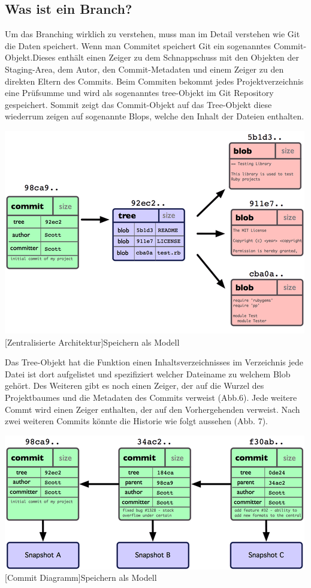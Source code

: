\documentclass[12pt,a4paper,bibliography=totocnumbered,listof=totocnumbered]{scrartcl}
\begin{document}
\subsection{Was ist ein Branch?}
Um das Branching wirklich zu verstehen, muss man im Detail verstehen wie Git die Daten speichert.	Wenn man Commitet speichert Git	ein sogenanntes Commit-Objekt.Dieses enthält einen Zeiger zu dem Schnappschuss mit den Objekten der Staging-Area, dem Autor, den Commit-Metadaten und einem Zeiger zu den direkten Eltern des Commits. Beim Commiten bekommt jedes Projektverzeichnis eine Prüfsumme und wird  als sogenanntes tree-Objekt im Git Repository gespeichert. Sommit zeigt das Commit-Objekt auf das Tree-Objekt	diese wiederrum zeigen auf sogenannte Blops, welche den Inhalt der Dateien enthalten.	
\vspace{1em}
\begin{minipage}{\linewidth}
	\centering
	\includegraphics[width=0.6\linewidth]{Bilder/speichern.png}
	[Zentralisierte Architektur]{Speichern als Modell\footnotemark }
	\label{fig:gitspeichern}
\end{minipage} 	

Das Tree-Objekt hat die Funktion einen Inhaltsverzeichnisses im Verzeichnis jede Datei ist dort aufgelistet und  spezifiziert welcher Dateiname zu welchem Blob gehört. Des Weiteren gibt es noch einen  Zeiger, der auf die Wurzel des Projektbaumes und die Metadaten des Commits verweist (Abb.6).	 
Jede weitere Commt wird einen Zeiger enthalten, der auf den Vorhergehenden verweist. Nach zwei weiteren Commits könnte die Historie wie folgt aussehen (Abb. 7).

\vspace{1em}
\begin{minipage}{\linewidth}
	\centering
	\includegraphics[width=0.6\linewidth]{Bilder/commit.png}
	[Commit Diagramm]{Speichern als Modell\footnotemark }
	\label{fig:gitspeichern}
\end{minipage} 	
\end{document}
